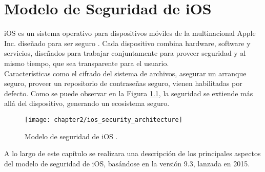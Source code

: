\chapter{Modelo de Seguridad de iOS}
iOS es un sistema operativo para dispositivos móviles de la multinacional Apple Inc. diseñado para ser
seguro \cite{asg}. Cada dispositivo combina hardware, software y servicios, diseñados para trabajar
conjuntamente para proveer seguridad y al mismo tiempo, que sea transparente para el
usuario.\\
Características como el cifrado del sistema de archivos, asegurar un arranque seguro, proveer un repositorio de contraseñas seguro, vienen habilitadas por defecto. Como se puede observar en la Figura \ref{fig:ch02:security-architecture}, la seguridad se extiende más allá del dispositivo, generando un ecosistema seguro.\\
\begin{figure}[hbtp]
    \centering
    \texttt{[image: chapter2/ios\_security\_architecture]}
    \caption{Modelo de seguridad de iOS \cite{asg}.} 
    \label{fig:ch02:security-architecture}
\end{figure}
\newpage
A lo largo de este capítulo se realizara una descripción de los principales aspectos del modelo de seguridad de iOS, basándose en la versión 9.3, lanzada en 2015.
